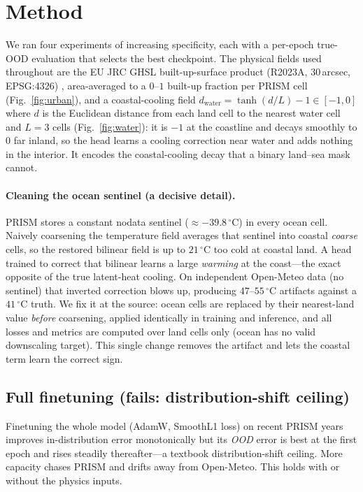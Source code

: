 \documentclass[11pt]{article}
\begin{document}
\section{Method}
We ran four experiments of increasing specificity, each with a per-epoch true-OOD
evaluation that selects the best checkpoint. The physical fields used throughout
are the EU JRC GHSL built-up-surface product (R2023A, 30\,arcsec, EPSG:4326)
\cite{ghsl}, area-averaged to a $0$--$1$ built-up fraction per PRISM cell
(Fig.~\ref{fig:urban}), and a coastal-cooling field
$d_\text{water}=\tanh(d/L)-1\in[-1,0]$ where $d$ is the Euclidean distance from
each land cell to the nearest water cell and $L=3$ cells (Fig.~\ref{fig:water}):
it is $-1$ at the coastline and decays smoothly to $0$ far inland, so the head
learns a cooling correction near water and adds nothing in the interior. It
encodes the coastal-cooling decay that a binary land--sea mask cannot.

\paragraph{Cleaning the ocean sentinel (a decisive detail).} PRISM stores a
constant nodata sentinel ($\approx-39.8\,^\circ\mathrm{C}$) in every ocean cell.
Naively coarsening the temperature field averages that sentinel into coastal
\emph{coarse} cells, so the restored bilinear field is up to
$21\,^\circ\mathrm{C}$ too cold at coastal land. A head trained to correct that
bilinear learns a large \emph{warming} at the coast---the exact opposite of the
true latent-heat cooling. On independent Open-Meteo data (no sentinel) that
inverted correction blows up, producing $47$--$55\,^\circ\mathrm{C}$ artifacts
against a $41\,^\circ\mathrm{C}$ truth. We fix it at the source: ocean cells are
replaced by their nearest-land value \emph{before} coarsening, applied identically
in training and inference, and all losses and metrics are computed over land cells
only (ocean has no valid downscaling target). This single change removes the
artifact and lets the coastal term learn the correct sign.

\subsection{Full finetuning (fails: distribution-shift ceiling)}
Finetuning the whole model (AdamW, SmoothL1 loss) on recent PRISM years improves
in-distribution error monotonically but its \emph{OOD} error is best at the first
epoch and rises steadily thereafter---a textbook distribution-shift ceiling. More
capacity chases PRISM and drifts away from Open-Meteo. This holds with or without
the physics inputs.
\end{document}
